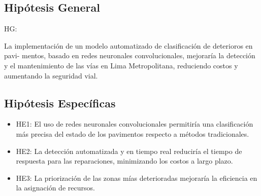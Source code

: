 \subsection{Hipótesis General}
HG: \newcommand{\HipotesisGeneral}{
	La implementación de un modelo automatizado de clasificación de deterioros en pavi-
	mentos, basado en redes neuronales convolucionales, mejoraría la detección y el mantenimiento
	de las vías en Lima Metropolitana, reduciendo costos y aumentando la seguridad vial.}
\HipotesisGeneral


\subsection{Hipótesis Específicas}
\newcommand{\Hone}{
El uso de redes neuronales convolucionales permitiría una clasificación más precisa del estado de los pavimentos respecto a métodos tradicionales.
}
\newcommand{\Htwo}{
La detección automatizada y en tiempo real reduciría el tiempo de respuesta para las reparaciones, minimizando los costos a largo plazo.
}

\newcommand{\Hthree}{
La priorización de las zonas mías deterioradas mejoraría la eficiencia en la asignación de recursos.
}
\newcommand{\Hfour}{
Las métricas de evaluación de rendimiento de los modelos de Deep Learning logra una correcta comparación de modelos en la tarea de clasificación de imágenes de ultrasonido.
}


\begin{itemize}
	\item HE1: {\Hone}
	\item HE2: {\Htwo}
	\item HE3: {\Hthree}
	
\end{itemize}